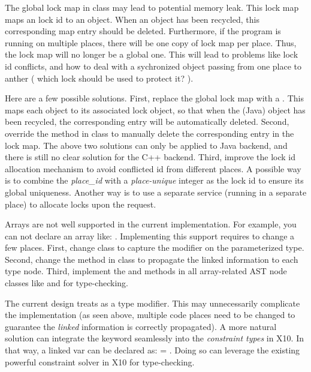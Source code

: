 \documentclass{article}
\begin{document}
\begin{enumerate}

\Item The global lock map  in class  may lead to potential memory leak. This lock map maps an  lock id to an  object. When an object has been recycled, this corresponding map entry should be deleted. Furthermore, if the program is running on multiple places, there will be one copy of lock map per place. Thus, the lock map will no longer be a global one. This will lead to problems like lock id conflicts, and how to deal with a sychronized object passing from one place to anther ( which lock should be used to protect it? ).

Here are a few possible solutions. First, replace the global lock map with a . This  maps each object to its associated lock object, so that when the (Java) object has been recycled, the corresponding entry will be automatically deleted. Second, override the  method in class  to manually delete the corresponding entry in the lock map. The above two solutions can only be applied to Java backend, and there is still no clear solution for the C++ backend. Third, improve the lock id allocation mechanism to avoid conflicted id from different places. A possible way is to combine the \textit{place\_id} with a \textit{place-unique} integer as the lock id to ensure its global uniqueness. Another way is to use a separate service (running in a separate place) to allocate locks upon the request.

\Item Arrays are not well supported in the current implementation. For example, you can not declare an array like:  . Implementing this support requires to change a few places.  First, change  class  to capture the  modifier on the parameterized type. Second, change the  method in class   to propagate the linked information to each type node. Third, implement the  and  methods in all array-related AST node classes like  and  for type-checking.

\Item  The current design treats  as a type modifier. This may unnecessarily complicate the implementation (as seen above, multiple code places need to be changed to guarantee the \textit{linked} information is correctly propagated). A more natural solution can integrate the  keyword seamlessly into the \textit{constraint types} in X10. In that way, a linked var can be declared as:  = . Doing so can leverage the existing powerful constraint solver in X10 for type-checking.


\end{enumerate}
\end{document}
